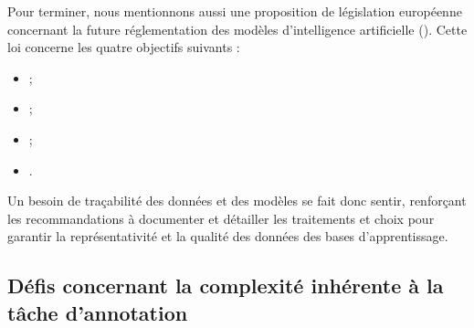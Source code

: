 			\begin{leftBarInformation}
				Pour terminer, nous mentionnons aussi une proposition de législation européenne concernant la future réglementation des modèles d'intelligence artificielle (\cite{european-commission:2021:proposal-regulation-european}).
				Cette loi concerne les quatre objectifs suivants :
				\begin{itemize}
					\item {} ;
					\item {} ;
					\item {} ;
					\item {}.
				\end{itemize}
				Un besoin de traçabilité des données et des modèles se fait donc sentir, renforçant les recommandations à documenter et détailler les traitements et choix pour garantir la représentativité et la qualité des données des bases d'apprentissage.
			\end{leftBarInformation}
		
		
	\subsection{Défis concernant la complexité inhérente à la tâche d'annotation}
	\label{section:2.3.2-DEFIS-ANNOTATION-ASPECT-COMPLEXITE}
	
